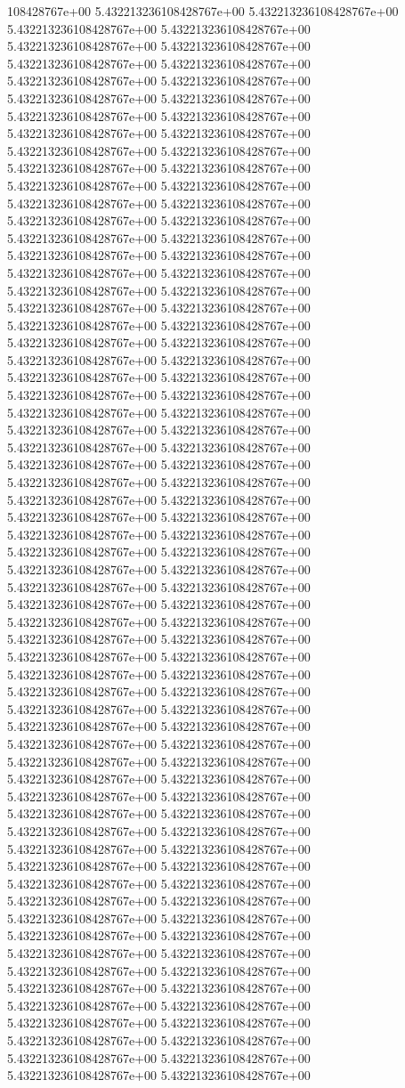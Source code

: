 108428767e+00	5.432213236108428767e+00	5.432213236108428767e+00	5.432213236108428767e+00	5.432213236108428767e+00	5.432213236108428767e+00	5.432213236108428767e+00	5.432213236108428767e+00	5.432213236108428767e+00	5.432213236108428767e+00	5.432213236108428767e+00	5.432213236108428767e+00	5.432213236108428767e+00	5.432213236108428767e+00	5.432213236108428767e+00	5.432213236108428767e+00	5.432213236108428767e+00	5.432213236108428767e+00	5.432213236108428767e+00	5.432213236108428767e+00	5.432213236108428767e+00	5.432213236108428767e+00	5.432213236108428767e+00	5.432213236108428767e+00	5.432213236108428767e+00	5.432213236108428767e+00	5.432213236108428767e+00	5.432213236108428767e+00	5.432213236108428767e+00	5.432213236108428767e+00	5.432213236108428767e+00	5.432213236108428767e+00	5.432213236108428767e+00	5.432213236108428767e+00	5.432213236108428767e+00	5.432213236108428767e+00	5.432213236108428767e+00	5.432213236108428767e+00	5.432213236108428767e+00	5.432213236108428767e+00	5.432213236108428767e+00	5.432213236108428767e+00	5.432213236108428767e+00	5.432213236108428767e+00	5.432213236108428767e+00	5.432213236108428767e+00	5.432213236108428767e+00	5.432213236108428767e+00	5.432213236108428767e+00	5.432213236108428767e+00	5.432213236108428767e+00	5.432213236108428767e+00	5.432213236108428767e+00	5.432213236108428767e+00	5.432213236108428767e+00	5.432213236108428767e+00	5.432213236108428767e+00	5.432213236108428767e+00	5.432213236108428767e+00	5.432213236108428767e+00	5.432213236108428767e+00	5.432213236108428767e+00	5.432213236108428767e+00	5.432213236108428767e+00	5.432213236108428767e+00	5.432213236108428767e+00	5.432213236108428767e+00	5.432213236108428767e+00	5.432213236108428767e+00	5.432213236108428767e+00	5.432213236108428767e+00	5.432213236108428767e+00	5.432213236108428767e+00	5.432213236108428767e+00	5.432213236108428767e+00	5.432213236108428767e+00	5.432213236108428767e+00	5.432213236108428767e+00	5.432213236108428767e+00	5.432213236108428767e+00	5.432213236108428767e+00	5.432213236108428767e+00	5.432213236108428767e+00	5.432213236108428767e+00	5.432213236108428767e+00	5.432213236108428767e+00	5.432213236108428767e+00	5.432213236108428767e+00	5.432213236108428767e+00	5.432213236108428767e+00	5.432213236108428767e+00	5.432213236108428767e+00	5.432213236108428767e+00	5.432213236108428767e+00	5.432213236108428767e+00	5.432213236108428767e+00	5.432213236108428767e+00	5.432213236108428767e+00	5.432213236108428767e+00	5.432213236108428767e+00	5.432213236108428767e+00	5.432213236108428767e+00	5.432213236108428767e+00	5.432213236108428767e+00	5.432213236108428767e+00	5.432213236108428767e+00	5.432213236108428767e+00	5.432213236108428767e+00	5.432213236108428767e+00	5.432213236108428767e+00	5.432213236108428767e+00	5.432213236108428767e+00	5.432213236108428767e+00	5.432213236108428767e+00	5.432213236108428767e+00	5.432213236108428767e+00	5.432213236108428767e+00	5.432213236108428767e+00	5.432213236108428767e+00	5.432213236108428767e+00	5.432213236108428767e+00	5.432213236108428767e+00	5.432213236108428767e+00	5.432213236108428767e+00	5.432213236108428767e+00
